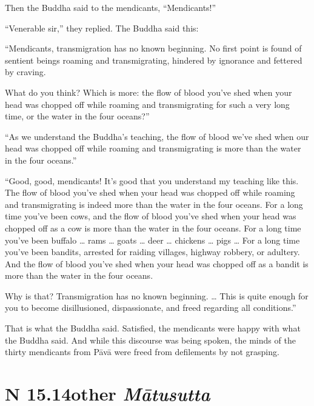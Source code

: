 \documentclass[12pt,openany]{book}%
\newcommand*{\suttatitleacronym}[1]{\smaller[2]{#1}\vspace*{.3em}}
\newcommand*{\suttatitletranslation}[1]{\linebreak{#1}}
\newcommand*{\suttatitleroot}[1]{\linebreak\smaller[2]\itshape{#1}}
\newcommand*{\tocacronym}[1]{\hspace*{-3.3em}{#1}\quad}
\newcommand*{\toctranslation}[1]{#1}
\newcommand*{\tocroot}[1]{(\textit{#1})}
\begin{document}
Then the Buddha said to the mendicants, “Mendicants!” 

“Venerable sir,” they replied. The Buddha said this: 

“Mendicants, transmigration has no known beginning. No first point is found of sentient beings roaming and transmigrating, hindered by ignorance and fettered by craving. 

What do you think? Which is more: the flow of blood you’ve shed when your head was chopped off while roaming and transmigrating for such a very long time, or the water in the four oceans?” 

“As we understand the Buddha’s teaching, the flow of blood we’ve shed when our head was chopped off while roaming and transmigrating is more than the water in the four oceans.” 

“Good, good, mendicants! It’s good that you understand my teaching like this. The flow of blood you’ve shed when your head was chopped off while roaming and transmigrating is indeed more than the water in the four oceans. For a long time you’ve been cows, and the flow of blood you’ve shed when your head was chopped off as a cow is more than the water in the four oceans. For a long time you’ve been buffalo … rams … goats … deer … chickens … pigs … For a long time you’ve been bandits, arrested for raiding villages, highway robbery, or adultery. And the flow of blood you’ve shed when your head was chopped off as a bandit is more than the water in the four oceans. 

Why is that? Transmigration has no known beginning. … This is quite enough for you to become disillusioned, dispassionate, and freed regarding all conditions.” 

That is what the Buddha said. Satisfied, the mendicants were happy with what the Buddha said. And while this discourse was being spoken, the minds of the thirty mendicants from \textsanskrit{Pāvā} were freed from defilements by not grasping. 

%
\section*{{\suttatitleacronym SN 15.14}{\suttatitletranslation Mother }{\suttatitleroot Mātusutta}}
\addcontentsline{toc}{section}{\tocacronym{SN 15.14} \toctranslation{Mother } \tocroot{Mātusutta}}
\end{document}
